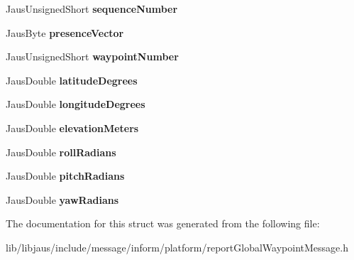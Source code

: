 \begin{DoxyCompactItemize}
\item 
\hypertarget{struct_report_global_waypoint_message_struct_a2d0207c7f35ad1cb4ed194113a4f6268}{\-Jaus\-Unsigned\-Short {\bfseries sequence\-Number}}\label{struct_report_global_waypoint_message_struct_a2d0207c7f35ad1cb4ed194113a4f6268}

\item 
\hypertarget{struct_report_global_waypoint_message_struct_a8bcf4dd24f8e8168ddf5b4bac2f0addc}{\-Jaus\-Byte {\bfseries presence\-Vector}}\label{struct_report_global_waypoint_message_struct_a8bcf4dd24f8e8168ddf5b4bac2f0addc}

\item 
\hypertarget{struct_report_global_waypoint_message_struct_a4035cc72ff70b5e647f64c4d3f055194}{\-Jaus\-Unsigned\-Short {\bfseries waypoint\-Number}}\label{struct_report_global_waypoint_message_struct_a4035cc72ff70b5e647f64c4d3f055194}

\item 
\hypertarget{struct_report_global_waypoint_message_struct_a48caa198909eebd9d758ddb95fa9e1ba}{\-Jaus\-Double {\bfseries latitude\-Degrees}}\label{struct_report_global_waypoint_message_struct_a48caa198909eebd9d758ddb95fa9e1ba}

\item 
\hypertarget{struct_report_global_waypoint_message_struct_a5ba974ea50141abe22db37cf83a41197}{\-Jaus\-Double {\bfseries longitude\-Degrees}}\label{struct_report_global_waypoint_message_struct_a5ba974ea50141abe22db37cf83a41197}

\item 
\hypertarget{struct_report_global_waypoint_message_struct_a18588a4bc770f77b7b61222f194e1154}{\-Jaus\-Double {\bfseries elevation\-Meters}}\label{struct_report_global_waypoint_message_struct_a18588a4bc770f77b7b61222f194e1154}

\item 
\hypertarget{struct_report_global_waypoint_message_struct_a7e48f08f8796df69ef0f873cdcee8509}{\-Jaus\-Double {\bfseries roll\-Radians}}\label{struct_report_global_waypoint_message_struct_a7e48f08f8796df69ef0f873cdcee8509}

\item 
\hypertarget{struct_report_global_waypoint_message_struct_a3898e21a08d0d2d6241285475d000fb8}{\-Jaus\-Double {\bfseries pitch\-Radians}}\label{struct_report_global_waypoint_message_struct_a3898e21a08d0d2d6241285475d000fb8}

\item 
\hypertarget{struct_report_global_waypoint_message_struct_a3628af10e83db167461d212f6afca6e0}{\-Jaus\-Double {\bfseries yaw\-Radians}}\label{struct_report_global_waypoint_message_struct_a3628af10e83db167461d212f6afca6e0}

\end{DoxyCompactItemize}


\-The documentation for this struct was generated from the following file\-:\begin{DoxyCompactItemize}
\item 
lib/libjaus/include/message/inform/platform/report\-Global\-Waypoint\-Message.\-h\end{DoxyCompactItemize}
